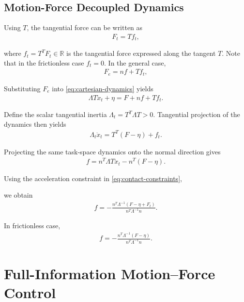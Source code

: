 \documentclass[10pt,journal,letterpaper]{IEEEtran}
\begin{document}
\subsection{Motion-Force Decoupled Dynamics}

Using $T$, the tangential force can be written as
\begin{align*}
F_{t} = Tf_{t},
\end{align*}

where $f_{t}=T^T F_{t} \in \mathbb{R}$ is the tangential force expressed along the tangent $T$. Note that in the frictionless case $f_{t}=0$. In the general case,
\begin{align*}
F_{e}=nf+Tf_{t},
\end{align*}

Substituting $F_e$ into \eqref{eq:cartesian-dynamics} yields
\begin{align*}
\Lambda T\ddot x_{t}+\eta
=
F+nf+Tf_{t}.
\end{align*}

Define the scalar tangential inertia $\Lambda_t=T^T\Lambda T>0$. Tangential projection of the dynamics then yields
\begin{equation}\label{eq:tangential-dynamics}
\begin{aligned}
\Lambda_{t}\ddot x_{t}
=
T^{T}(F-\eta)+f_{t}.
\end{aligned}
\end{equation}

Projecting the same task-space dynamics onto the normal direction gives
\begin{align*}
f
=
n^{T}\Lambda T\ddot x_{t}
-
n^{T}(F-\eta).
\end{align*}

Using the acceleration constraint in \eqref{eq:contact-constraints},

we obtain
\begin{align*}
f
=
-
\frac{
n^{T}\Lambda^{-1}(F-\eta+F_{t})
}{
n^{T}\Lambda^{-1}n
}.
\end{align*}

In frictionless case, 
\begin{equation}\label{eq:reaction-force}
\begin{aligned}
f
=
-
\frac{
n^{T}\Lambda^{-1}(F-\eta)
}{
n^{T}\Lambda^{-1}n
}.
\end{aligned}
\end{equation}

\section{Full-Information Motion--Force Control}\label{sec:fic}
\end{document}
